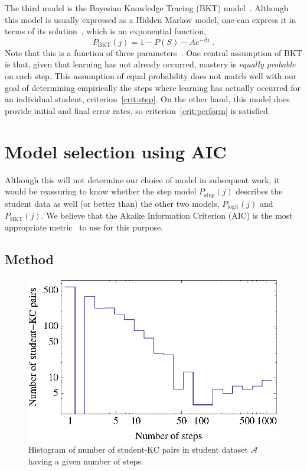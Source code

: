 \documentclass[prodmode,acmtecs]{acmsmall}
\begin{document}
The third model is the Bayesian Knowledge Tracing (BKT) model~\cite{anderson}.
Although this model is usually expressed as a Hidden Markov model, 
one can express it in terms of its solution~\cite{bktsolution},
which is an exponential function,
%
\begin{equation}
         P_\mathrm{BKT}(j) = 1-P(S) -A e^{-\beta j} \; .
\end{equation}
%
Note that this is a function of three parameters~\cite{bktsolution}.
One central assumption of BKT is that, given that learning
has not already occurred, mastery is {\em equally probable} on each step.
This assumption of equal probability does not match well with 
our goal of determining empirically the steps where learning has 
actually occurred for an individual student, criterion~\ref{crit:step}.
On the other hand, this model does provide initial and final
error rates, so criterion~\ref{crit:perform} is satisfied. 

\section{Model selection using AIC}
\label{model-selection}

Although this will not determine our choice of model in subsequent
work, it would be reassuring to know whether the step model 
$P_\mathrm{step}(j)$
describes the student data as well (or better than) the
other two models, $P_\mathrm{logit}(j)$ and $P_\mathrm{BKT}(j)$.  
We believe that the Akaike Information 
Criterion (AIC) is the most appropriate metric~\cite{akaike,aicbook}
to use for this purpose.

\subsection{Method}


\begin{figure}
  \centering \includegraphics{student-kc-length-histogram.eps}
  \caption{Histogram of number of student-KC pairs in student 
    dataset $\mathcal{A}$ having a given number of steps.}
    \label{student-length-histogram}
\end{figure}
\end{document}
